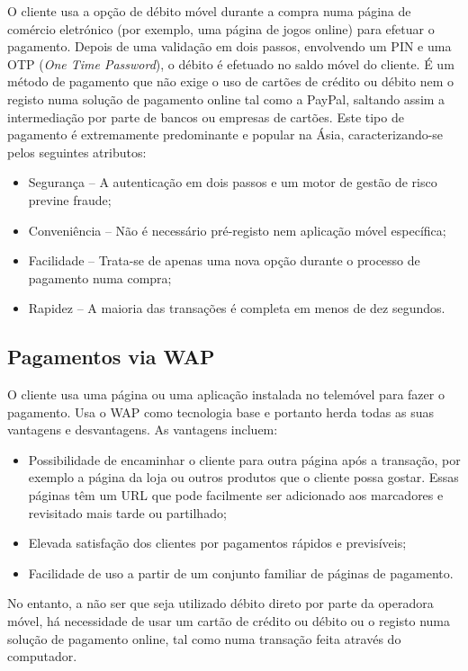 O cliente usa a opção de débito móvel durante a compra numa página \web de comércio eletrónico (por exemplo, uma página de jogos online) para efetuar o pagamento. Depois de uma validação em dois passos, envolvendo um PIN e uma OTP (\textit{One Time Password}), o débito é efetuado no saldo móvel do cliente. É um método de pagamento que não exige o uso de cartões de crédito ou débito nem o registo numa solução de pagamento online tal como a PayPal, saltando assim a intermediação por parte de bancos ou empresas de cartões.\cite{dmb} Este tipo de pagamento é extremamente predominante e popular na Ásia, caracterizando-se pelos seguintes atributos:
\begin{itemize}
\item Segurança – A autenticação em dois passos e um motor de gestão de risco previne fraude;
\item Conveniência – Não é necessário pré-registo nem aplicação móvel específica;
\item Facilidade – Trata-se de apenas uma nova opção durante o processo de pagamento numa compra;
\item Rapidez – A maioria das transações é completa em menos de dez segundos.
\end{itemize}

\subsection{Pagamentos via WAP} \label{wap} 

O cliente usa uma página \web ou uma aplicação instalada no telemóvel para fazer o pagamento. Usa o WAP como tecnologia base e portanto herda todas as suas vantagens e desvantagens. As vantagens incluem:
\begin{itemize}
\item Possibilidade de encaminhar o cliente para outra página após a transação, por exemplo a página da loja ou outros produtos que o cliente possa gostar. Essas páginas têm um URL que pode facilmente ser adicionado aos marcadores e revisitado mais tarde ou partilhado;
\item Elevada satisfação dos clientes por pagamentos rápidos e previsíveis;
\item Facilidade de uso a partir de um conjunto familiar de páginas de pagamento.
\end{itemize}
No entanto, a não ser que seja utilizado débito direto por parte da operadora móvel, há necessidade de usar um cartão de crédito ou débito ou o registo numa solução de pagamento online, tal como numa transação feita através do computador.

